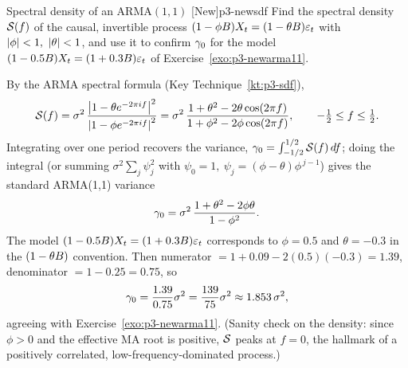 \begin{exercise}{Spectral density of an $\mathrm{ARMA}(1,1)$ \quad\textnormal{[New]}}{p3-newsdf}
Find the spectral density $\mathcal{S}(f)$ of the causal, invertible process
$(1-\phi B)X_t=(1-\theta B)\varepsilon_t$ with $\left\lvert \phi \right\rvert<1,\ \left\lvert \theta \right\rvert<1$, and use
it to confirm $\gamma_0$ for the model
$(1-0.5B)X_t=(1+0.3B)\varepsilon_t$ of Exercise~\ref{exo:p3-newarma11}.
\end{exercise}
\begin{solution}
By the ARMA spectral formula (Key Technique~\ref{kt:p3-sdf}),
\[
\mathcal{S}(f)=\sigma^2\,\frac{\left\lvert 1-\theta e^{-2\pi i f} \right\rvert^2}{\left\lvert 1-\phi e^{-2\pi i f} \right\rvert^2}
=\sigma^2\,\frac{1+\theta^2-2\theta\cos(2\pi f)}{1+\phi^2-2\phi\cos(2\pi f)},
\qquad -\tfrac12\le f\le\tfrac12 .
\]
Integrating over one period recovers the variance,
$\gamma_0=\int_{-1/2}^{1/2}\mathcal{S}(f)\,df$; doing the integral (or summing
$\sigma^2\sum_j\psi_j^2$ with $\psi_0=1,\ \psi_j=(\phi-\theta)\phi^{\,j-1}$) gives
the standard ARMA(1,1) variance
\[
\gamma_0=\sigma^2\,\frac{1+\theta^2-2\phi\theta}{1-\phi^2}.
\]
The model $(1-0.5B)X_t=(1+0.3B)\varepsilon_t$ corresponds to $\phi=0.5$ and
$\theta=-0.3$ in the $(1-\theta B)$ convention. Then numerator
$=1+0.09-2(0.5)(-0.3)=1.39$, denominator $=1-0.25=0.75$, so
\[
\gamma_0=\frac{1.39}{0.75}\sigma^2=\frac{139}{75}\sigma^2\approx1.853\,\sigma^2,
\]
agreeing with Exercise~\ref{exo:p3-newarma11}. (Sanity check on the density:
since $\phi>0$ and the effective MA root is positive, $\mathcal{S}$ peaks at $f=0$, the
hallmark of a positively correlated, low-frequency-dominated process.)
\end{solution}

